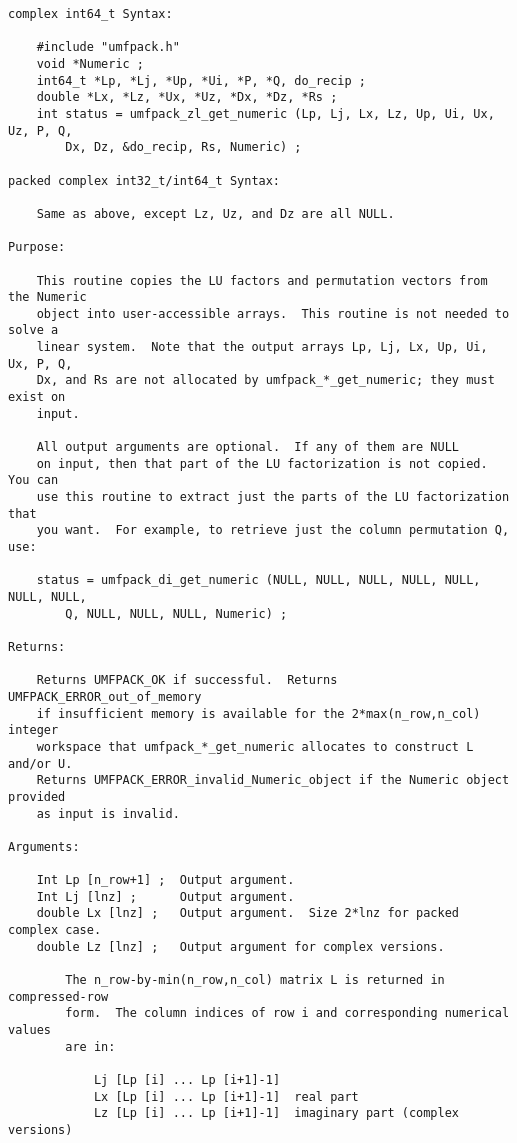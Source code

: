 \documentclass[11pt]{article}
\begin{document}
{\begin{verbatim}
complex int64_t Syntax:

    #include "umfpack.h"
    void *Numeric ;
    int64_t *Lp, *Lj, *Up, *Ui, *P, *Q, do_recip ;
    double *Lx, *Lz, *Ux, *Uz, *Dx, *Dz, *Rs ;
    int status = umfpack_zl_get_numeric (Lp, Lj, Lx, Lz, Up, Ui, Ux, Uz, P, Q,
        Dx, Dz, &do_recip, Rs, Numeric) ;

packed complex int32_t/int64_t Syntax:

    Same as above, except Lz, Uz, and Dz are all NULL.

Purpose:

    This routine copies the LU factors and permutation vectors from the Numeric
    object into user-accessible arrays.  This routine is not needed to solve a
    linear system.  Note that the output arrays Lp, Lj, Lx, Up, Ui, Ux, P, Q,
    Dx, and Rs are not allocated by umfpack_*_get_numeric; they must exist on
    input.

    All output arguments are optional.  If any of them are NULL
    on input, then that part of the LU factorization is not copied.  You can
    use this routine to extract just the parts of the LU factorization that
    you want.  For example, to retrieve just the column permutation Q, use:

    status = umfpack_di_get_numeric (NULL, NULL, NULL, NULL, NULL, NULL, NULL,
        Q, NULL, NULL, NULL, Numeric) ;

Returns:

    Returns UMFPACK_OK if successful.  Returns UMFPACK_ERROR_out_of_memory
    if insufficient memory is available for the 2*max(n_row,n_col) integer
    workspace that umfpack_*_get_numeric allocates to construct L and/or U.
    Returns UMFPACK_ERROR_invalid_Numeric_object if the Numeric object provided
    as input is invalid.

Arguments:

    Int Lp [n_row+1] ;  Output argument.
    Int Lj [lnz] ;      Output argument.
    double Lx [lnz] ;   Output argument.  Size 2*lnz for packed complex case.
    double Lz [lnz] ;   Output argument for complex versions.

        The n_row-by-min(n_row,n_col) matrix L is returned in compressed-row
        form.  The column indices of row i and corresponding numerical values
        are in:

            Lj [Lp [i] ... Lp [i+1]-1]
            Lx [Lp [i] ... Lp [i+1]-1]  real part
            Lz [Lp [i] ... Lp [i+1]-1]  imaginary part (complex versions)


\end{verbatim}}
\end{document}
